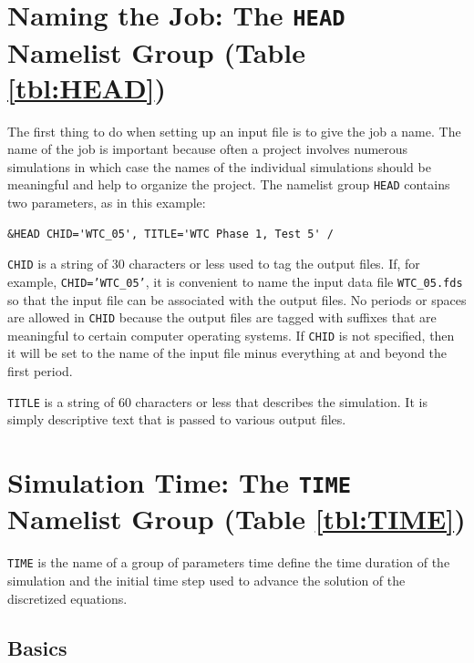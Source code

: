 \documentclass[11pt]{book}
\newcommand{\ct}{\tt\small}
\begin{document}
\section{Naming the Job: The \texorpdfstring{{\tt HEAD}}{HEAD} Namelist Group (Table \ref{tbl:HEAD})}
\label{info:HEAD}

The first thing to do when setting up an input file is to give the
job a name.  The name of the job is important because often a project
involves numerous simulations in which case the names of the individual
simulations should be meaningful and help to organize the project.  The namelist group {\ct HEAD} contains
two parameters, as in this example:

\footnotesize
\begin{verbatim}
&HEAD CHID='WTC_05', TITLE='WTC Phase 1, Test 5' /
\end{verbatim}
\normalsize

\begin{description}
\item {\ct CHID} is a string of 30 characters or less used to tag the output files.
If, for example, {\ct CHID='WTC\_05'}, it is convenient to
name the input data file {\ct WTC\_05.fds} so that the input file
can be associated with the output files. No periods or spaces are allowed in
{\ct CHID} because the output files are tagged with suffixes that
are meaningful to certain computer operating systems.  If {\ct CHID} is not
specified, then it will be set to the name of the input file minus everything at and beyond the first period.
\item {\ct TITLE} is a string of 60 characters or less that describes the
simulation. It is simply descriptive text that is passed to various output files.
\end{description}


\section{Simulation Time: The \texorpdfstring{{\tt TIME}}{TIME} Namelist Group (Table \ref{tbl:TIME})}
\label{info:TIME}

{\ct TIME} is the name of a group of parameters time define the time
duration of the simulation and the initial time step used to advance
the solution of the discretized equations.

\subsection{Basics}
\label{info:TIME_Basics}
\end{document}
